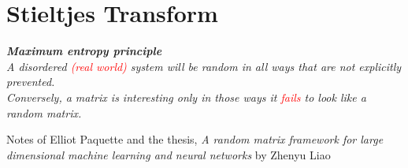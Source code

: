 \documentclass[10pt]{beamer}
\begin{document}



\section{Stieltjes Transform}

\begin{frame}{}
\begin{center}
    \textit{\textbf{Maximum entropy principle} \\ \medskip
    A disordered \textcolor{red}{\small (real world)} system will be random in all ways that are not explicitly prevented.
    }\\ \medskip
    \textit{Conversely, a matrix is interesting only in those ways it \textcolor{red}{fails} to look like a random matrix.}
\end{center}

\vspace{3cm}

{\footnotesize Notes of Elliot Paquette and the thesis, \textit{A random matrix framework for large dimensional
machine learning and neural networks} by {Zhenyu Liao} }
\end{frame}
\end{document}
